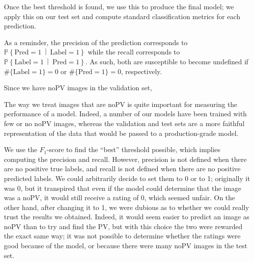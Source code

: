 \documentclass[10pt,conference]{IEEEtran}
\renewcommand\P[1]{\mathbb{P}\!\left\{#1\right\}}
\newcommand\given{\:\middle|\:}
\newcommand\tl[1]{\{\text{Label} = #1\}}
\newcommand\pl[1]{\{\text{Pred} = #1\}}
\newcommand\tp{\{\text{Pred} = 1 \cap \text{Label} = 1\}}
\newcommand\tn{\{\text{Pred} = 0 \cap \text{Label} = 0\}}
\begin{document}
Once the best threshold is found, we use this to produce
the final model; we apply this on our test set and compute
standard classification metrics for each prediction.


As a reminder, the precision of the prediction
corresponds to $\P{\text{Pred}=1 \given \text{Label} = 1}$ while
the recall corresponds to $\P{\text{Label}=1 \given \text{Pred} = 1}$.
As such, both are susceptible to become undefined if
$\#\tl1 = 0$ or $\#\pl1 = 0$, respectively.

Since we have noPV images in the validation set, 

% 

The way we treat images that are noPV is quite important for
measuring the performance of a model.
Indeed, a number of our models have been trained with few or no
noPV images, whereas the validation and test sets are a more
faithful representation of the data that would be passed to a
production-grade model.

We use the $F_1$-score to find the ``best'' threshold possible, which implies computing the precision and recall.
However, precision is not defined when there are no positive true labels,
and recall is not defined when there are no positive predicted labels.
We could arbitrarily decide to set them to 0 or to 1;
originally it was 0, but it transpired that even if
the model could determine that the image was a noPV, it
would still receive a rating of 0, which seemed unfair.
On the other hand, after changing it to 1, we were
dubious as to whether we could really trust the results
we obtained. Indeed, it would seem easier to predict an
image as noPV than to try and find the PV, but with this
choice the two were rewarded the exact same way; it was
not possible to determine whether the ratings were
good because of the model, or because there were many
noPV images in the test set.
\end{document}
